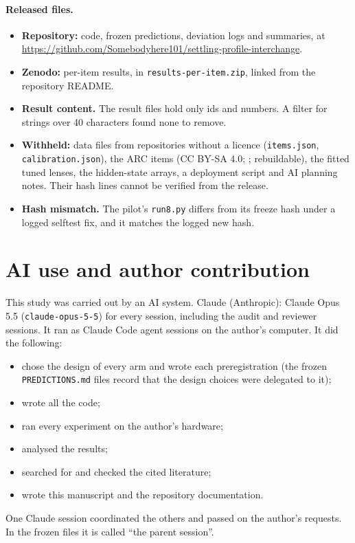 \documentclass[11pt]{article}
\begin{document}
\paragraph{Released files.}
\begin{itemize}
\item \textbf{Repository:} code, frozen predictions, deviation logs and summaries, at \url{https://github.com/Somebodyhere101/settling-profile-interchange}.
\item \textbf{Zenodo:} per-item results, in \texttt{results-per-item.zip}, linked from the repository README.
\item \textbf{Result content.} The result files hold only ids and numbers. A filter for strings over 40 characters found none to remove.
\item \textbf{Withheld:} data files from repositories without a licence (\texttt{items.json}, \texttt{calibration.json}), the ARC items (CC BY-SA 4.0; \citealp{clark2018arc}; rebuildable), the fitted tuned lenses, the hidden-state arrays, a deployment script and AI planning notes. Their hash lines cannot be verified from the release.
\item \textbf{Hash mismatch.} The pilot's \texttt{run8.py} differs from its freeze hash under a logged selftest fix, and it matches the logged new hash.
\end{itemize}

\section*{AI use and author contribution}

This study was carried out by an AI system. Claude (Anthropic): Claude Opus 5.5 (\texttt{claude-opus-5-5}) for every session, including the audit and reviewer sessions. It ran as Claude Code agent sessions on the author's computer. It did the following:
\begin{itemize}
\item chose the design of every arm and wrote each preregistration (the frozen \texttt{PREDICTIONS.md} files record that the design choices were delegated to it);
\item wrote all the code;
\item ran every experiment on the author's hardware;
\item analysed the results;
\item searched for and checked the cited literature;
\item wrote this manuscript and the repository documentation.
\end{itemize}
One Claude session coordinated the others and passed on the author's requests. In the frozen files it is called ``the parent session''.
\end{document}
